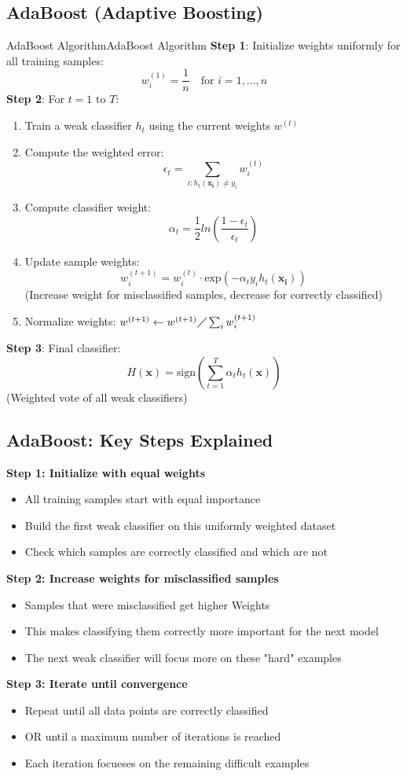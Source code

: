 \documentclass[a4paper]{article}
\theoremstyle{definition}
\begin{document}
\subsection{AdaBoost (Adaptive Boosting)}
\begin{definition}{AdaBoost Algorithm}{AdaBoost Algorithm}
\textbf{Step 1}: Initialize weights uniformly for all training samples:
\[
  w_i^{(1)} = \frac{1}{n} \quad \text{for } i = 1, \ldots, n 
\]
\textbf{Step 2}: For \( t = 1 \) to \( T \):
\begin{enumerate}
    \item Train a weak classifier \( h_t \) using the current weights \( w^{(t)} \)   
    \item Compute the weighted error:
    \[
      \epsilon_t = \sum_{i:h_t(\mathbf{x_i}) \neq y_i} w_i^{(t)}
    \]
    \item Compute classifier weight:
    \[
      \alpha_t = \frac{1}{2}ln(\frac{1 - \epsilon_t}{\epsilon_t})
    \]
    \item Update sample weights:
    \[
      w_i^{(t + 1)} = w_i^{(t)} \cdot \text{exp}(- \alpha_t y_i h_t(\mathbf{x_i}))
    \]
    (Increase weight for misclassified samples, decrease for correctly classified)
    \item Normalize weights: \( w^{(t + 1)} \leftarrow w^{(t + 1)} \diagup \sum_i w_i^{(t + 1)} \)
\end{enumerate}
\textbf{Step 3}: Final classifier:
\[
  H(\mathbf{x}) = \text{sign}(\sum_{t = 1}^{T} \alpha_t h_t(\mathbf{x}))
\]
(Weighted vote of all weak classifiers)
\end{definition}
\subsection{AdaBoost: Key Steps Explained}
\textbf{Step 1: Initialize with equal weights}
\begin{itemize}
    \item All training samples start with equal importance 
    \item Build the first weak classifier on this uniformly weighted dataset 
    \item Check which samples are correctly classified and which are not
\end{itemize}
\textbf{Step 2: Increase weights for misclassified samples}
\begin{itemize}
    \item Samples that were misclassified get higher Weights
    \item This makes classifying them correctly more important for the next model 
    \item The next weak classifier will focus more on these "hard" examples 
\end{itemize}
\textbf{Step 3: Iterate until convergence}
\begin{itemize}
    \item Repeat until all data points are correctly classified 
    \item OR until a maximum number of iterations is reached 
    \item Each iteration focueses on the remaining difficult examples
\end{itemize}
\end{document}

